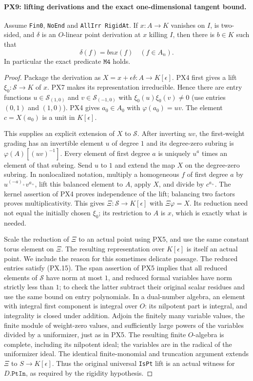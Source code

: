 \paragraph{PX9: lifting derivations and the exact one-dimensional tangent bound.}
\label{claim:PX9}
Assume \texttt{Fin0}, \texttt{NoEnd} and
\texttt{AllIrr RigidAt}.  If $x:A\to K$ vanishes on
$I$, is two-sided, and $\delta$ is an $O$-linear
point derivation at $x$ killing $I$, then there is
$b\in K$ such that
\[
                   \delta(f)=b n x(f)
                       \quad(f\in A_n).
 \tag{PX.23}
\]
In particular the exact predicate $\mathtt{M4}$ holds.

\begin{proof}
Package the derivation as
$X=x+\epsilon\delta:A\to K[\epsilon]$.
PX4 first gives a lift $\xi_0:\mathcal S\to K$
of $x$.  PX7 makes its representation
irreducible.  Hence there are entry functions
$u\in\mathcal S_{(1,0)}$ and
$v\in\mathcal S_{(-1,0)}$ with
$\xi_0(u)\xi_0(v)\ne0$ (use entries
$(0,1)$ and $(1,0)$).  PX4 gives
$a_0\in A_0$ with $\varphi(a_0)=uv$.
The element $c=X(a_0)$ is a unit in
$K[\epsilon]$.

This supplies an explicit extension of
$X$ to $\mathcal S$.  After inverting
$uv$, the first-weight grading has
an invertible element $u$ of degree
$1$ and its degree-zero subring is
$\varphi(A)[(uv)^{-1}]$.  Every element
of first degree $a$ is uniquely $u^a$
times an element of that subring.
Send $u$ to $1$ and extend the map
$X$ on the degree-zero subring.
In nonlocalized notation, multiply
a homogeneous $f$ of first degree
$a$ by $u^{(-a)_+}v^{a_+}$, lift
this balanced element to $A$, apply
$X$, and divide by $c^{a_+}$.
The kernel assertion of PX4 proves
independence of the lift; balancing
two factors proves multiplicativity.
This gives
$\Xi:\mathcal S\to K[\epsilon]$
with $\Xi\varphi=X$.  Its reduction
need not equal the initially chosen
$\xi_0$; its restriction to $A$ is
$x$, which is exactly what is needed.

Scale the reduction of $\Xi$ to an
actual point using PX5, and use the
same constant torus element on $\Xi$.
The resulting representation over
$K[\epsilon]$ is itself an actual
point.  We include the reason for
this sometimes delicate passage.
The reduced entries satisfy (PX.15).
The span assertion of PX5 implies
that all reduced elements of
$\mathcal S$ have norm at most $1$,
and reduced formal variables have
norm strictly less than $1$; to
check the latter subtract their
original scalar residues and use
the same bound on entry polynomials.
In a dual-number algebra, an element
with integral first component is
integral over $O$: its nilpotent
part is integral, and integrality
is closed under addition.  Adjoin
the finitely many variable values,
the finite module of weight-zero
values, and sufficiently large
powers of the variables divided
by a uniformizer, just as in PX5.
The resulting finite $O$-algebra
is complete, including its nilpotent
ideal; the variables are in the
radical of the uniformizer ideal.
The identical finite-monomial and
truncation argument extends $\Xi$
to $S\to K[\epsilon]$.  Thus the
original universal \texttt{IsPt}
lift is an actual witness for
$D.\mathtt{PtIn}$, as required by
the rigidity hypothesis.


\end{proof}
